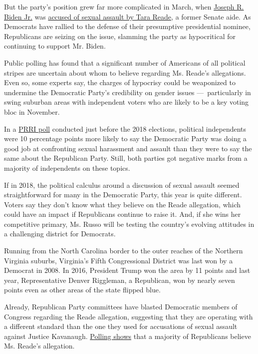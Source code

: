 But the party's position grew far more complicated in March, when
\href{https://www.nytimes3xbfgragh.onion/interactive/2020/us/elections/joe-biden.html}{Joseph
R. Biden Jr.} was
\href{https://www.nytimes3xbfgragh.onion/2020/04/12/us/politics/joe-biden-tara-reade-sexual-assault-complaint.html}{accused
of sexual assault by Tara Reade}, a former Senate aide. As Democrats
have rallied to the defense of their presumptive presidential nominee,
Republicans are seizing on the issue, slamming the party as hypocritical
for continuing to support Mr. Biden.

Public polling has found that a significant number of Americans of all
political stripes are uncertain about whom to believe regarding Ms.
Reade's allegations. Even so, some experts say, the charges of hypocrisy
could be weaponized to undermine the Democratic Party's credibility on
gender issues ---~particularly in swing suburban areas with independent
voters who are likely to be a key voting bloc in November.

In a
\href{https://www.prri.org/wp-content/uploads/2018/10/Partisan-Polarization-2018_AVS-C.pdf}{PRRI
poll} conducted just before the 2018 elections, political independents
were 10 percentage points more likely to say the Democratic Party was
doing a good job at confronting sexual harassment and assault than they
were to say the same about the Republican Party. Still, both parties got
negative marks from a majority of independents on these topics.

If in 2018, the political calculus around a discussion of sexual assault
seemed straightforward for many in the Democratic Party, this year is
quite different. Voters say they don't know what they believe on the
Reade allegation, which could have an impact if Republicans continue to
raise it. And, if she wins her competitive primary, Ms. Russo will be
testing the country's evolving attitudes in a challenging district for
Democrats.

Running from the North Carolina border to the outer reaches of the
Northern Virginia suburbs, Virginia's Fifth Congressional District was
last won by a Democrat in 2008. In 2016, President Trump won the area by
11 points and last year, Representative Denver Riggleman, a Republican,
won by nearly seven points even as other areas of the state flipped
blue.

Already, Republican Party committees have blasted Democratic members of
Congress regarding the Reade allegation, suggesting that they are
operating with a different standard than the one they used for
accusations of sexual assault against Justice Kavanaugh.
\href{https://poll.qu.edu/national/release-detail?ReleaseID=3661}{Polling
shows} that a majority of Republicans believe Ms. Reade's allegation.

